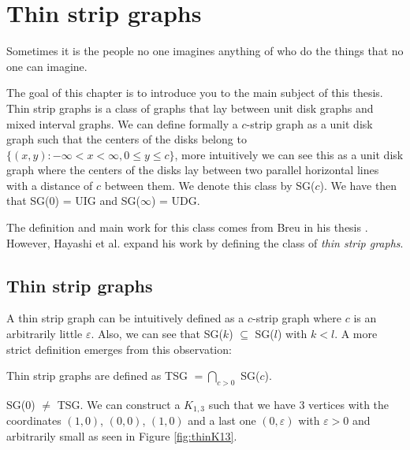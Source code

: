 \chapter{Thin strip graphs}
\label{chap:thinDef}

\begin{fquote}
  Sometimes it is the people no one imagines anything of who do the things that no one can imagine.
\end{fquote}

The goal of this chapter is to introduce you to the main subject of this thesis. Thin strip graphs is a class of graphs that lay between unit disk graphs
and mixed interval graphs. We can define formally a $c$-strip graph as a unit disk graph such that the centers of the disks belong to $\{(x,y) : -\infty < x < \infty, 0 \leq y \leq c\}$, more intuitively we can see this as a unit disk graph where the centers of the disks lay between two parallel horizontal lines with a distance of $c$ between them. We denote this class by SG($c$). We
have then that SG($0$) = UIG and SG($\infty$) = UDG.

The definition and main work for this class comes from Breu in his thesis \cite{breuAlgorithmicAspectsConstrained1996}. However, Hayashi et al. \cite{hayashiThinStripGraphs2017} expand his work by defining the class of \emph{thin strip graphs}.

\section{Thin strip graphs}

A thin strip graph can be intuitively defined as a $c$-strip graph where $c$ is an arbitrarily little $\varepsilon$. Also, we can see that SG($k$) $\subseteq$ SG($l$) with $k<l$. A more strict definition emerges from this observation:

\begin{defn}
  Thin strip graphs are defined as TSG $= \bigcap_{c > 0}$ SG($c$).
\end{defn}

\begin{remark}
  SG($0$) $\neq$ TSG. We can construct a $K_{1,3}$ such that we have 3 vertices with the coordinates
  $(1,0)$, $(0,0)$, $(1,0)$ and a last one $(0,\varepsilon)$ with $\varepsilon > 0$ and arbitrarily small
  as seen in Figure \ref{fig:thinK13}.
\end{remark}

